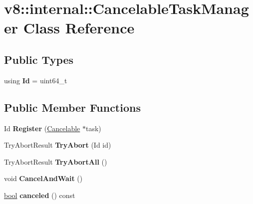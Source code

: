 \hypertarget{classv8_1_1internal_1_1CancelableTaskManager}{}\section{v8\+:\+:internal\+:\+:Cancelable\+Task\+Manager Class Reference}
\label{classv8_1_1internal_1_1CancelableTaskManager}
\subsection*{Public Types}
\begin{DoxyCompactItemize}
\item 
\mbox{\label{classv8_1_1internal_1_1CancelableTaskManager_afd51b41b3b41751744fa3203cc424e00}} 
using {\bfseries Id} = uint64\+\_\+t
\end{DoxyCompactItemize}
\subsection*{Public Member Functions}
\begin{DoxyCompactItemize}
\item 
\mbox{\label{classv8_1_1internal_1_1CancelableTaskManager_ac9c33ca75ceb8e939aab07d4c2d1ed63}} 
Id {\bfseries Register} (\mbox{\hyperlink{classv8_1_1internal_1_1Cancelable}{Cancelable}} $\ast$task)
\item 
\mbox{\label{classv8_1_1internal_1_1CancelableTaskManager_aee123633df3403c91bc08a3aa193507b}} 
Try\+Abort\+Result {\bfseries Try\+Abort} (Id id)
\item 
\mbox{\label{classv8_1_1internal_1_1CancelableTaskManager_ad6a1a49eee7af7a72e0ffd7e07ad62fe}} 
Try\+Abort\+Result {\bfseries Try\+Abort\+All} ()
\item 
\mbox{\label{classv8_1_1internal_1_1CancelableTaskManager_a3c90c3d841ccd5255387b37fcfbc03c0}} 
void {\bfseries Cancel\+And\+Wait} ()
\item 
\mbox{\label{classv8_1_1internal_1_1CancelableTaskManager_a48b81663f11a3352c03b804a531e79b6}} 
\mbox{\hyperlink{classbool}{bool}} {\bfseries canceled} () const
\end{DoxyCompactItemize}
